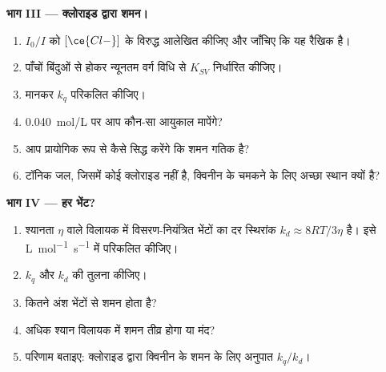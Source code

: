 \begin{problem}
\medskip\noindent\textbf{भाग III --- क्लोराइड द्वारा शमन।}
\begin{enumerate}[resume]
  \item $I_0/I$ को $[\ce{Cl-}]$ के विरुद्ध आलेखित कीजिए और जाँचिए कि यह रैखिक है।
  \item पाँचों बिंदुओं से होकर न्यूनतम वर्ग विधि से $K_{SV}$ निर्धारित कीजिए।
  \item {} मानकर $k_q$ परिकलित कीजिए।
  \item \qty{0.040}{mol/L} पर आप कौन-सा आयुकाल मापेंगे?
  \item आप प्रायोगिक रूप से कैसे सिद्ध करेंगे कि शमन गतिक है?
  \item टॉनिक जल, जिसमें कोई क्लोराइड नहीं है, क्विनीन के चमकने के लिए अच्छा स्थान
        क्यों है?
\end{enumerate}

\medskip\noindent\textbf{भाग IV --- हर भेंट?}
\begin{enumerate}[resume]
  \item श्यानता $\eta$ वाले विलायक में विसरण-नियंत्रित भेंटों का दर स्थिरांक
        $k_d \approx 8RT/3\eta$ है। इसे \unit{L.mol^{-1}.s^{-1}} में परिकलित कीजिए।
  \item $k_q$ और $k_d$ की तुलना कीजिए।
  \item कितने अंश भेंटों से शमन होता है?
  \item अधिक श्यान विलायक में शमन तीव्र होगा या मंद?
  \item परिणाम बताइए: क्लोराइड द्वारा क्विनीन के शमन के लिए अनुपात $k_q/k_d$।
\end{enumerate}
\end{problem}
